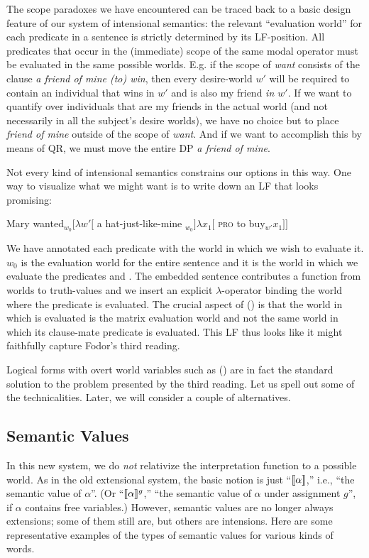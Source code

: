 The scope paradoxes we have encountered can be traced back to a basic design feature of our system of intensional semantics: the relevant ``evaluation world'' for each predicate in a sentence is strictly determined by its LF-position. All predicates that occur in the (immediate) scope of the same modal operator must be evaluated in the same possible worlds. E.g. if the scope of \emph{want} consists of the clause \emph{a friend of mine (to) win}, then every desire-world $w'$ will be required to contain an individual that wins in $w'$ and is also my friend \emph{in $w'$}. If we want to quantify over individuals that are my friends in the actual world (and not necessarily in all the subject's desire worlds), we have no choice but to place \emph{friend of mine} outside of the scope of \emph{want}. And if we want to accomplish this by means of QR, we must move the entire DP \emph{a friend of mine}.

Not every kind of intensional semantics constrains our options in this way. One way to visualize what we might want is to write down an LF that looks promising:

\ex Mary wanted$_{w_0} [ \lambda w' [$ a hat-just-like-mine $_{w_0}] \lambda x_1 [$ \textsc{pro} to buy$_{w'} x_{1} ]]$ \xe

We have annotated each predicate with the world in which we wish to evaluate it. $w_0$ is the evaluation world for the entire sentence and it is the world in which we evaluate the predicates  and . The embedded sentence contributes a function from worlds to truth-values and we insert an explicit $\lambda$-operator binding the world where the predicate  is evaluated. The crucial aspect of (\lastx) is that the world in which  is evaluated is the matrix evaluation world and not the same world in which its clause-mate predicate  is evaluated. This LF thus looks like it might faithfully capture Fodor's third reading.

Logical forms with overt world variables such as (\lastx) are in fact the standard solution to the problem presented by the third reading. Let us spell out some of the technicalities. Later, we will consider a couple of alternatives.

\subsection{Semantic Values}

In this new system, we do \emph{not} relativize the interpretation function to a possible world. As in the old extensional system, the basic notion is just ``$\llbracket \alpha \rrbracket$,'' i.e., ``the semantic value of $\alpha$''. (Or ``$\llbracket \alpha \rrbracket^g$,'' ``the semantic value of $\alpha$ under assignment $g$'', if $\alpha$ contains free variables.) However, semantic values are no longer always extensions; some of them still are, but others are intensions. Here are some representative examples of the types of semantic values for various kinds of words.

